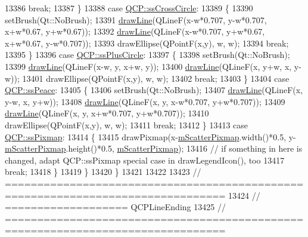 \begin{DoxyCode}
13386       \textcolor{keywordflow}{break};
13387     \}
13388     \textcolor{keywordflow}{case} \hyperlink{a00143_af66d0711d42fe78d96c28abadc67f26fa32c6bc5b7596ba0cca2342ef6e846fbe}{QCP::ssCrossCircle}:
13389     \{
13390       setBrush(Qt::NoBrush);
13391       \hyperlink{a00047_a0b4b1b9bd495e182c731774dc800e6e0}{drawLine}(QLineF(x-w*0.707, y-w*0.707, x+w*0.67, y+w*0.67));
13392       \hyperlink{a00047_a0b4b1b9bd495e182c731774dc800e6e0}{drawLine}(QLineF(x-w*0.707, y+w*0.67, x+w*0.67, y-w*0.707));
13393       drawEllipse(QPointF(x,y), w, w);
13394       \textcolor{keywordflow}{break};
13395     \}
13396     \textcolor{keywordflow}{case} \hyperlink{a00143_af66d0711d42fe78d96c28abadc67f26fa78f2658826f26f4d266962845a1bb827}{QCP::ssPlusCircle}:
13397     \{
13398       setBrush(Qt::NoBrush);
13399       \hyperlink{a00047_a0b4b1b9bd495e182c731774dc800e6e0}{drawLine}(QLineF(x-w, y, x+w, y));
13400       \hyperlink{a00047_a0b4b1b9bd495e182c731774dc800e6e0}{drawLine}(QLineF(x, y+w, x, y-w));
13401       drawEllipse(QPointF(x,y), w, w);
13402       \textcolor{keywordflow}{break};
13403     \}
13404     \textcolor{keywordflow}{case} \hyperlink{a00143_af66d0711d42fe78d96c28abadc67f26fae2ed4e86e8d0676b7c1476a1e8692070}{QCP::ssPeace}:
13405     \{
13406       setBrush(Qt::NoBrush);
13407       \hyperlink{a00047_a0b4b1b9bd495e182c731774dc800e6e0}{drawLine}(QLineF(x, y-w, x, y+w));
13408       \hyperlink{a00047_a0b4b1b9bd495e182c731774dc800e6e0}{drawLine}(QLineF(x, y, x-w*0.707, y+w*0.707));
13409       \hyperlink{a00047_a0b4b1b9bd495e182c731774dc800e6e0}{drawLine}(QLineF(x, y, x+w*0.707, y+w*0.707));
13410       drawEllipse(QPointF(x,y), w, w);
13411       \textcolor{keywordflow}{break};
13412     \}
13413     \textcolor{keywordflow}{case} \hyperlink{a00143_af66d0711d42fe78d96c28abadc67f26fa3046d385199d0903dd492322ba133e75}{QCP::ssPixmap}:
13414     \{
13415       drawPixmap(x-\hyperlink{a00047_a20d67229e0977ad7ce3a3c7349cbd59c}{mScatterPixmap}.width()*0.5, y-\hyperlink{a00047_a20d67229e0977ad7ce3a3c7349cbd59c}{mScatterPixmap}.height()*0.5, 
      \hyperlink{a00047_a20d67229e0977ad7ce3a3c7349cbd59c}{mScatterPixmap});
13416       \textcolor{comment}{// if something in here is changed, adapt QCP::ssPixmap special case in drawLegendIcon(), too}
13417       \textcolor{keywordflow}{break};
13418     \}
13419   \}
13420 \}
13421 
13422 
13423 \textcolor{comment}{// ================================================================================}
13424 \textcolor{comment}{// =================== QCPLineEnding}
13425 \textcolor{comment}{// ================================================================================}

\end{DoxyCode}
